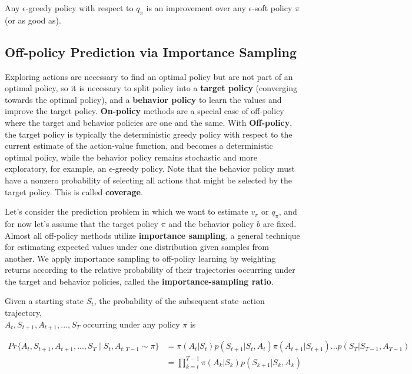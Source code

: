 \documentclass[11pt]{article}
\begin{document}
Any \(\epsilon\)-greedy policy with respect to \(q_{\pi}\) is an improvement over any
\(\epsilon\)-soft policy \(\pi\) (or as good as).

\subsection{Off-policy Prediction via Importance Sampling}
\label{sec:org5b6c15d}

Exploring actions are necessary to find an optimal policy but are not part of an
optimal policy, so it is necessary to split policy into a \textbf{target policy}
(converging towards the optimal policy), and a \textbf{behavior policy} to learn the
values and improve the target policy. \textbf{On-policy} methods are a special case of
off-policy where the target and behavior policies are one and the same. With
\textbf{Off-policy}, the target policy is typically the deterministic greedy policy
with respect to the current estimate of the action-value function, and
becomes a deterministic optimal policy, while the behavior policy remains
stochastic and more exploratory, for example, an \(\epsilon\)-greedy policy. Note
that the behavior policy must have a nonzero probability of selecting all
actions that might be selected by the target policy. This is called \textbf{coverage}.

Let's consider the prediction problem in which we want to estimate \(v_{\pi}\) or
\(q_{\pi}\), and for now let's assume that the target policy \(\pi\) and the behavior
policy \(b\) are fixed. Almost all off-policy methods utilize \textbf{importance
sampling}, a general technique for estimating expected values under one
distribution given samples from another. We apply importance sampling to
off-policy learning by weighting returns according to the relative probability
of their trajectories occurring under the target and behavior policies, called
the \textbf{importance-sampling ratio}.

Given a starting state \(S_{t}\), the probability of the subsequent state–action
trajectory, \\
\(A_{t}, S_{t+1}, A_{t+1}, {...}, S_{T}\) occurring under any policy \(\pi\) is

\begin{equation}
\begin{aligned}
Pr\{ A_{t}, S_{t+1}, A_{t+1}, {...}, S_{T} \mid S_{t}, A_{t:T-1} \sim \pi \}
&= \pi(A_{t}|S_{t}) p(S_{t+1}|S_{t}, A_{t}) \pi(A_{t+1}|S_{t+1}) {...} p(S_{T}|S_{T-1}, A_{T-1})\\
&= \prod\limits_{k=t}^{T-1} \pi(A_{k}|S_{k}) p(S_{k+1}|S_{k}, A_{k})
\end{aligned}
\end{equation}
\end{document}
